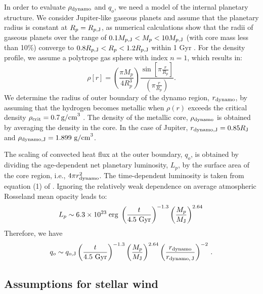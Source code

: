 \documentclass[iop,numberedappendix,apj]{emulateapj}
\begin{document}
In order to evaluate $\rho _{\rm dynamo}$ and $q_o$, we need a model of the internal planetary structure. 
We consider Jupiter-like gaseous planets and assume that the planetary radius is constant at $R_p = R_{p,{\rm J}}$, as numerical calculations show that the radii of gaseous planets over the range of $0.1 M_{p,{\rm J}} < M_p < 10M_{p, {\rm J}}$ (with core mass less than 10\%) converge to $0.8 R_{p,{\rm J}} < R_p < 1.2R_{p, {\rm J}}$ within 1 Gyr \citep{fortney2007}. 
For the density profile, we assume a polytrope gas sphere with index $n=1$, which results in:
\begin{equation}
\rho [r] = \left( \frac{\pi M_p}{4 R_p^3} \right) \frac{\sin \left[ \pi \frac{r}{R_p} \right]}{\left( \pi \frac{r}{R_p} \right)}. \label{eq:rho_r}
\end{equation}
We determine the radius of outer boundary of the dynamo region, $r_{\rm dynamo}$, by assuming that the hydrogen becomes metallic when $\rho (r)$ exceeds the critical density $\rho_{\rm crit}=0.7\,\mbox{g/cm}^3$ \citep{exoplanets2006, griesmeier2007b}.
The density of the metallic core, $\rho _{\rm dynamo}$ is obtained by averaging the density in the core. 
In the case of Jupiter, $r_{\rm dynamo, J} = 0.85 R_{\rm J}$ and $\rho_{\rm dynamo, J} = 1.899~{\rm g/cm}^3$.

The scaling of convected heat flux at the outer boundary, $q_o$, is obtained by dividing the age-dependent net planetary luminosity, $L_p$, by the surface area of the core region, i.e., $4\pi r_{\rm dynamo}^2$. 
The time-dependent luminosity is taken from equation (1) of \citet{burrows_et_al2001} \citep[see also][]{marley2007}. 
Ignoring the relatively weak dependence on average atmospheric Rosseland mean opacity leads to:
\begin{equation}	
L_p \sim 6.3\times10^{23} \; {\rm erg} \; \left( \frac{t}{4.5 \rm~Gyr} \right)^{-1.3} \left( \frac{M_p}{M_{\rm J}} \right)^{2.64} \, 
\label{eq:burrowsLum}
\end{equation}
Therefore, we have
\begin{equation}
q_o \sim q_{o, {\rm J}} \left( \frac{t}{4.5 \rm~Gyr} \right)^{-1.3} \left( \frac{M_p}{M_{\rm J}} \right)^{2.64} \left( \frac{r_{\rm dynamo}}{r_{\rm dynamo,\,J}} \right)^{-2}\, .
\label{eq:burrowsHeatFlux}
\end{equation}



\subsection{Assumptions for stellar wind}
\label{ss:stellarwind}
\end{document}
